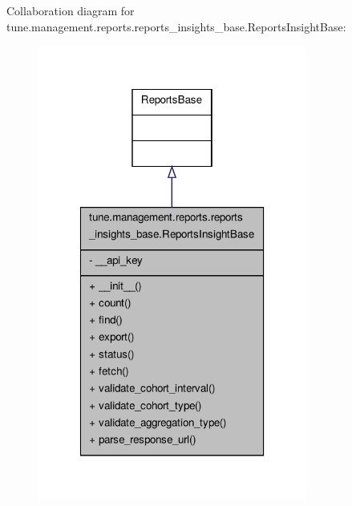 Collaboration diagram for tune.\-management.\-reports.\-reports\-\_\-insights\-\_\-base.\-Reports\-Insight\-Base\-:
\nopagebreak
\begin{figure}[H]
\begin{center}
\leavevmode
\includegraphics[width=250pt]{classtune_1_1management_1_1reports_1_1reports__insights__base_1_1ReportsInsightBase__coll__graph}
\end{center}
\end{figure}
